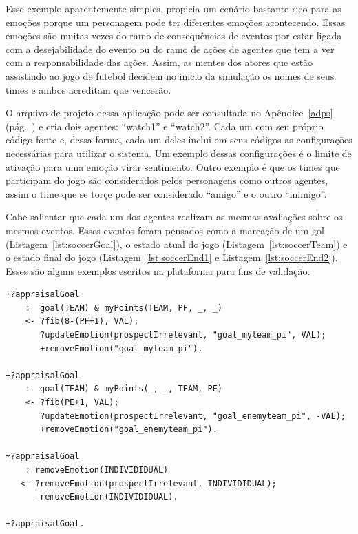 Esse exemplo aparentemente simples, propicia um cenário bastante rico para as
emoções porque um personagem pode ter diferentes emoções acontecendo.
Essas emoções são muitas vezes do ramo de consequências de eventos por
estar ligada com a desejabilidade do evento ou do ramo de ações de agentes que
tem a ver com a responsabilidade das ações. Assim, as mentes dos atores que estão
assistindo ao jogo de futebol decidem no inicio da simulação os nomes de seus
times e ambos acreditam que vencerão.

O arquivo de projeto dessa aplicação pode ser consultada no Apêndice~\ref{adps}
(pág.~\pageref{adps}) e cria dois agentes:
``watch1'' e ``watch2''. Cada um com seu próprio código fonte e,
dessa forma, cada um deles inclui em seus códigos as configurações
necessárias para utilizar o sistema. Um exemplo dessas configurações
é o limite de ativação para uma emoção virar sentimento. Outro exemplo é que
os times que participam do jogo são considerados pelos personagens como outros
agentes, assim o time que se torçe pode ser considerado ``amigo'' e o outro
``inimigo''.

Cabe salientar que cada um dos agentes realizam as mesmas avaliações sobre os
mesmos eventos. Esses eventos foram pensados como a marcação de um gol
(Listagem~\ref{lst:soccerGoal}), o estado atual do jogo
(Listagem~\ref{lst:soccerTeam}) e  o estado final do jogo
(Listagem~\ref{lst:soccerEnd1} e Listagem~\ref{lst:soccerEnd2}).
Esses são alguns exemplos escritos na plataforma \jason para
fins de validação.

\begin{center}
    \begin{minipage}{120mm}
	\lstset{linewidth=120mm}
	\begin{lstlisting}[frame=trbl,
caption=Parte do código do agente referente à avaliação de gol.,
label=lst:soccerGoal]
+?appraisalGoal
    :  goal(TEAM) & myPoints(TEAM, PF, _, _)
    <- ?fib(8-(PF+1), VAL);
       ?updateEmotion(prospectIrrelevant, "goal_myteam_pi", VAL);
       +removeEmotion("goal_myteam_pi").

+?appraisalGoal
    :  goal(TEAM) & myPoints(_, _, TEAM, PE)
    <- ?fib(PE+1, VAL);
       ?updateEmotion(prospectIrrelevant, "goal_enemyteam_pi", -VAL);
       +removeEmotion("goal_enemyteam_pi").

+?appraisalGoal
    : removeEmotion(INDIVIDIDUAL)
   <- ?removeEmotion(prospectIrrelevant, INDIVIDIDUAL);
      -removeEmotion(INDIVIDIDUAL).

+?appraisalGoal.
	\end{lstlisting}
    \end{minipage}
\end{center}

